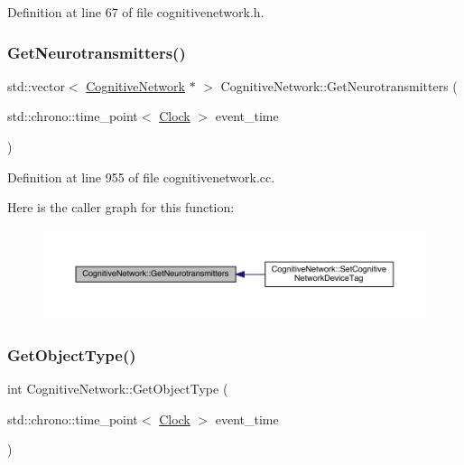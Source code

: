 Definition at line 67 of file cognitivenetwork.\+h.

\mbox{\label{class_cognitive_network_ac56b1585864b372c8897dcb5720d00a7}} 
\subsubsection{\texorpdfstring{Get\+Neurotransmitters()}{GetNeurotransmitters()}}
{\footnotesize\ttfamily std\+::vector$<$ \hyperlink{class_cognitive_network}{Cognitive\+Network} $\ast$ $>$ Cognitive\+Network\+::\+Get\+Neurotransmitters (\begin{DoxyParamCaption}\item[{std\+::chrono\+::time\+\_\+point$<$ \hyperlink{universe_8h_a0ef8d951d1ca5ab3cfaf7ab4c7a6fd80}{Clock} $>$}]{event\+\_\+time }\end{DoxyParamCaption})}



Definition at line 955 of file cognitivenetwork.\+cc.

Here is the caller graph for this function\+:
\nopagebreak
\begin{figure}[H]
\begin{center}
\leavevmode
\includegraphics[width=350pt]{class_cognitive_network_ac56b1585864b372c8897dcb5720d00a7_icgraph}
\end{center}
\end{figure}
\mbox{\label{class_cognitive_network_a1c92a8f6c42788cf8ca890f062f853a3}} 
\subsubsection{\texorpdfstring{Get\+Object\+Type()}{GetObjectType()}}
{\footnotesize\ttfamily int Cognitive\+Network\+::\+Get\+Object\+Type (\begin{DoxyParamCaption}\item[{std\+::chrono\+::time\+\_\+point$<$ \hyperlink{universe_8h_a0ef8d951d1ca5ab3cfaf7ab4c7a6fd80}{Clock} $>$}]{event\+\_\+time }\end{DoxyParamCaption})\hspace{0.3cm}{\ttfamily [inline]}}



